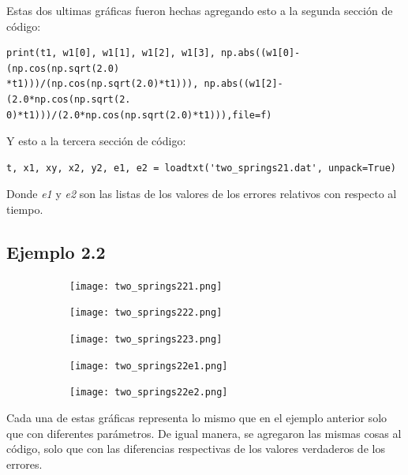 \documentclass{article}
\begin{document}
Estas dos ultimas gráficas fueron hechas agregando esto a la segunda sección de código:

\begin{verbatim}
print(t1, w1[0], w1[1], w1[2], w1[3], np.abs((w1[0]-(np.cos(np.sqrt(2.0)
*t1)))/(np.cos(np.sqrt(2.0)*t1))), np.abs((w1[2]-(2.0*np.cos(np.sqrt(2.
0)*t1)))/(2.0*np.cos(np.sqrt(2.0)*t1))),file=f)
\end{verbatim}

Y esto a la tercera sección de código:

\begin{verbatim}
t, x1, xy, x2, y2, e1, e2 = loadtxt('two_springs21.dat', unpack=True)
\end{verbatim}

Donde \textit{e1} y \textit{e2} son las listas de los valores de los errores relativos con respecto al tiempo.

\vspace{5cm}

\subsection*{Ejemplo 2.2}

\begin{figure}[h!]
  \centering
  \begin{subfigure}[b]{0.32\linewidth}
    \texttt{[image: two\_springs221.png]}
     \caption{}
  \end{subfigure}
  \begin{subfigure}[b]{0.32\linewidth}
    \texttt{[image: two\_springs222.png]}
    \caption{}
  \end{subfigure}
  \begin{subfigure}[b]{0.32\linewidth}
    \texttt{[image: two\_springs223.png]}
    \caption{}
  \end{subfigure}
  \begin{subfigure}[b]{0.45\linewidth}
    \texttt{[image: two\_springs22e1.png]}
    \caption{}
  \end{subfigure}
  \begin{subfigure}[b]{0.45\linewidth}
    \texttt{[image: two\_springs22e2.png]}
    \caption{}
  \end{subfigure}
\end{figure}

Cada una de estas gráficas representa lo mismo que en el ejemplo anterior solo que con diferentes parámetros. De igual manera, se agregaron las mismas cosas al código, solo que con las diferencias respectivas de los valores verdaderos de los errores.
\end{document}
